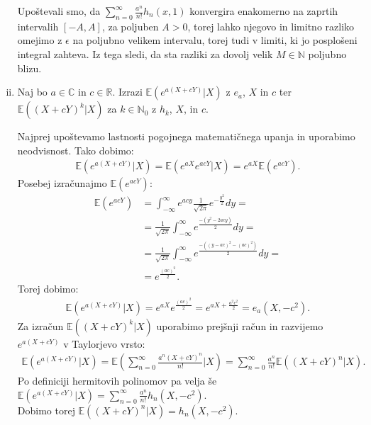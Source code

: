 \documentclass[ letterpaper, titlepage, fleqn]{article}
\begin{document}
\begin{enumerate}[(i)]
Upoštevali smo, da $\sum_{n=0}^{\infty} \frac{a^n}{n!} h_n(x, 1)$ konvergira enakomerno na zaprtih intervalih $[-A, A]$, 
za poljuben $A > 0$, torej lahko njegovo in limitno razliko omejimo z $\epsilon$ na poljubno velikem intervalu,
torej tudi v limiti, ki jo posplošeni integral zahteva.
Iz tega sledi, da sta razliki za dovolj velik $M \in \mathbb{N}$ poljubno blizu.\bigskip


\item Naj bo $a \in \mathbb{C}$ in $c \in \mathbb{R}$. Izrazi $\mathbb{E}\left( e^{a\left(X+cY\right)}|X\right)$ z $e_a$, $X$ in $c$ ter $\mathbb{E}\left(\left(X+cY\right)^{k}|X\right)$ za $k \in \mathbb{N}_0$ z $h_k$, $X$, in $c$.
 
Najprej upoštevamo lastnosti pogojnega matematičnega upanja in uporabimo neodvisnost. Tako dobimo:
\begin{equation*}
\begin{aligned}
\mathbb{E}\left( e^{a\left(X+cY\right)}|X\right)=\mathbb{E}\left( e^{aX}e^{acY}|X\right)=e^{aX}\mathbb{E}\left(e^{acY}\right).
\end{aligned}
\end{equation*}
Posebej izračunajmo $\mathbb{E}\left(e^{acY}\right)$:
\begin{equation*}
\begin{aligned}
\mathbb{E}\left(e^{acY}\right)&=\int_{-\infty}^{\infty}e^{acy}\frac{1}{\sqrt{2\pi}} e^{-\frac{y^2}{2}} dy=\\[8px]
&=\frac{1}{\sqrt{2\pi}}\int_{-\infty}^{\infty}e^{\frac{-\left(y^2-2acy\right)}{2}}dy=\\[8px]
&=\frac{1}{\sqrt{2\pi}}\int_{-\infty}^{\infty}e^{\frac{-\left(\left(y-ac\right)^2-\left(ac\right)^2\right)}{2}}dy=\\[8px]
&=e^\frac{(ac)^2}{2}.
\end{aligned}
\end{equation*}
Torej dobimo:
\begin{equation*}
\begin{aligned}
\mathbb{E}\left( e^{a\left(X+cY\right)}|X\right)=e^{aX}e^\frac{\left(ac\right)^2}{2}=e^{aX+\frac{a^2c^2}{2}}=e_a\left(X,-c^2\right).
\end{aligned}
\end{equation*}
Za izračun $\mathbb{E}\left(\left(X+cY\right)^{k}|X\right)$ uporabimo prejšnji račun in razvijemo $e^{a\left(X+cY\right)}$ v Taylorjevo vrsto:
\begin{equation*}
\begin{aligned}
\mathbb{E}\left( e^{a\left(X+cY\right)}|X\right)=\mathbb{E}\left(\sum_{n=0}^{\infty}\frac{a^n\left(X+cY\right)^n}{n!}|X\right)=\sum_{n=0}^{\infty}\frac{a^n}{n!}\mathbb{E}((X+cY)^n|X). 
\end{aligned}
\end{equation*}
Po definiciji hermitovih polinomov pa velja še $\mathbb{E}\left( e^{a\left(X+cY\right)}|X\right)=
\sum_{n=0}^{\infty} \frac{a^n}{n!} h_n\left(X, -c^2\right)$. \\
Dobimo torej $\mathbb{E}\left(\left(X+cY\right)^{n}|X\right)=h_n\left(X,-c^2\right)$.
\end{enumerate}
\end{document}
